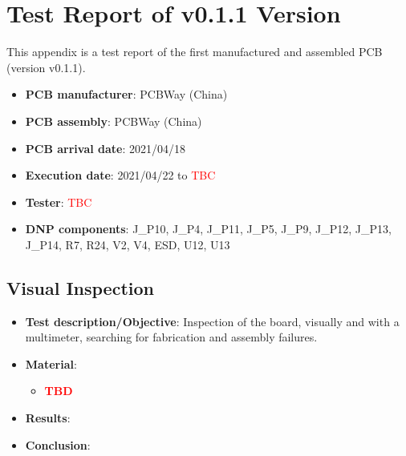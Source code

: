 %
%
%
%
%

%
%
%
%
%

\chapter{Test Report of v0.1.1 Version} \label{anx:test-report-v011}

This appendix is a test report of the first manufactured and assembled PCB (version v0.1.1).

\begin{itemize}
    \item \textbf{PCB manufacturer}: PCBWay (China)
    \item \textbf{PCB assembly}: PCBWay (China)
    \item \textbf{PCB arrival date}: 2021/04/18
    \item \textbf{Execution date}: 2021/04/22 to \textcolor{red}{TBC}
    \item \textbf{Tester}: \textcolor{red}{TBC}
    \item \textbf{DNP components}: J\_P10, J\_P4, J\_P11, J\_P5, J\_P9, J\_P12, J\_P13, J\_P14, R7, R24, V2, V4, ESD, U12, U13
\end{itemize}

\section{Visual Inspection}

\begin{itemize}
    \item \textbf{Test description/Objective}: Inspection of the board, visually and with a multimeter, searching for fabrication and assembly failures.
    \item \textbf{Material}:
        \begin{itemize}
            \item \textcolor{red}{\textbf{TBD}}
        \end{itemize}
    \item \textbf{Results}: %
    \item \textbf{Conclusion}: %
\end{itemize}

